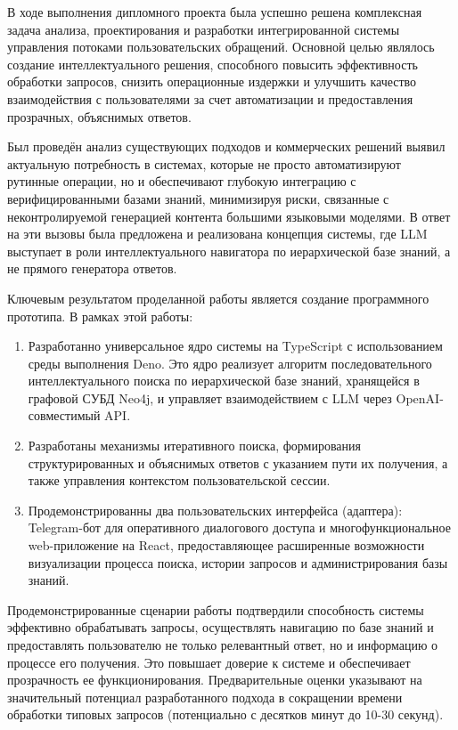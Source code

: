 
В ходе выполнения дипломного проекта была успешно решена комплексная задача анализа, проектирования и разработки интегрированной системы управления потоками пользовательских обращений. Основной целью являлось создание интеллектуального решения, способного повысить эффективность обработки запросов, снизить операционные издержки и улучшить качество взаимодействия с пользователями за счет автоматизации и предоставления прозрачных, объяснимых ответов.

Был проведён анализ существующих подходов и коммерческих решений выявил актуальную потребность в системах, которые не просто автоматизируют рутинные операции, но и обеспечивают глубокую интеграцию с верифицированными базами знаний, минимизируя риски, связанные с неконтролируемой генерацией контента большими языковыми моделями. В ответ на эти вызовы была предложена и реализована концепция системы, где LLM выступает в роли интеллектуального навигатора по иерархической базе знаний, а не прямого генератора ответов.

Ключевым результатом проделанной работы является создание программного прототипа. В рамках этой работы:

\begin{enumerate}[label=\arabic*.]
    \item Разработанно универсальное ядро системы на TypeScript с использованием среды выполнения Deno. Это ядро реализует алгоритм последовательного интеллектуального поиска по иерархической базе знаний, хранящейся в графовой СУБД Neo4j, и управляет взаимодействием с LLM через OpenAI-совместимый API.
    \item Разработаны механизмы итеративного поиска, формирования структурированных и объяснимых ответов с указанием пути их получения, а также управления контекстом пользовательской сессии.
    \item Продемонстрированны два пользовательских интерфейса (адаптера): Telegram-бот для оперативного диалогового доступа и многофункциональное web-приложение на React, предоставляющее расширенные возможности визуализации процесса поиска, истории запросов и администрирования базы знаний.
\end{enumerate}

Продемонстрированные сценарии работы подтвердили способность системы эффективно обрабатывать запросы, осуществлять навигацию по базе знаний и предоставлять пользователю не только релевантный ответ, но и информацию о процессе его получения. Это повышает доверие к системе и обеспечивает прозрачность ее функционирования. Предварительные оценки указывают на значительный потенциал разработанного подхода в сокращении времени обработки типовых запросов (потенциально с десятков минут до 10-30 секунд).

